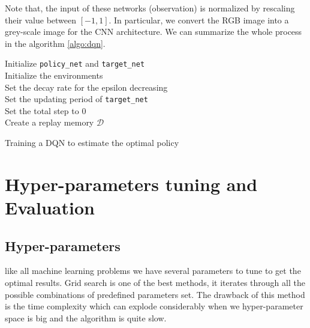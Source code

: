 Note that, the input of these networks (observation) is normalized by rescaling their value between $[-1,1]$. In particular, we convert the RGB image into a grey-scale image for the CNN architecture.
We can summarize the whole process in the algorithm \ref{algo:dqn}.
\begin{algorithm}
	Initialize \texttt{policy\_net} and \texttt{target\_net}\\
	Initialize the environments\\
	Set the decay rate for the epsilon decreasing\\
	Set the updating period of \texttt{target\_net}\\
	Set the total step to $0$\\
	Create a replay memory $\mathcal{D}$\\
	\caption{Training a DQN to estimate the optimal policy}
	\label{algo:dqn}
\end{algorithm}
\section{Hyper-parameters tuning and Evaluation}
\subsection{Hyper-parameters}
like all machine learning problems we have several parameters to tune to get the optimal results. Grid search is one of the best methods, it iterates through all the possible combinations of predefined parameters set. The drawback of this method is the time complexity which can explode considerably when we hyper-parameter space is big and the algorithm is quite slow.

